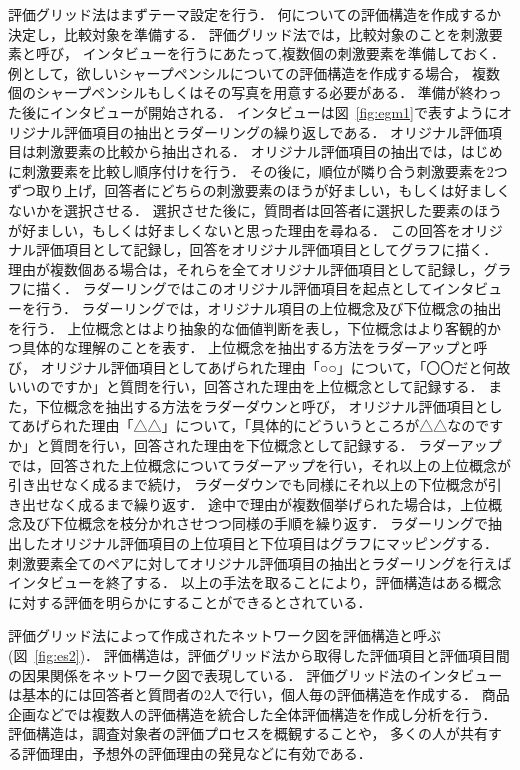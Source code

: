\documentclass[syuuron]{kuee}
\begin{document}
		評価グリッド法はまずテーマ設定を行う．
		何についての評価構造を作成するか決定し，比較対象を準備する．
		評価グリッド法では，比較対象のことを刺激要素と呼び，
		インタビューを行うにあたって,複数個の刺激要素を準備しておく．
		例として，欲しいシャープペンシルについての評価構造を作成する場合，
		複数個のシャープペンシルもしくはその写真を用意する必要がある．
		準備が終わった後にインタビューが開始される．
		インタビューは図~\ref{fig:egm1}で表すようにオリジナル評価項目の抽出とラダーリングの繰り返しである．
		オリジナル評価項目は刺激要素の比較から抽出される．
		オリジナル評価項目の抽出では，はじめに刺激要素を比較し順序付けを行う．
		その後に，順位が隣り合う刺激要素を2つずつ取り上げ，回答者にどちらの刺激要素のほうが好ましい，もしくは好ましくないかを選択させる．
		選択させた後に，質問者は回答者に選択した要素のほうが好ましい，もしくは好ましくないと思った理由を尋ねる．
		この回答をオリジナル評価項目として記録し，回答をオリジナル評価項目としてグラフに描く．
		理由が複数個ある場合は，それらを全てオリジナル評価項目として記録し，グラフに描く．
		ラダーリングではこのオリジナル評価項目を起点としてインタビューを行う．
		ラダーリングでは，オリジナル項目の上位概念及び下位概念の抽出を行う．
		上位概念とはより抽象的な価値判断を表し，下位概念はより客観的かつ具体的な理解のことを表す．
		上位概念を抽出する方法をラダーアップと呼び，
		オリジナル評価項目としてあげられた理由「○○」について，「〇〇だと何故いいのですか」と質問を行い，回答された理由を上位概念として記録する．
		また，下位概念を抽出する方法をラダーダウンと呼び，
		オリジナル評価項目としてあげられた理由「△△」について，「具体的にどういうところが△△なのですか」と質問を行い，回答された理由を下位概念として記録する．
		ラダーアップでは，回答された上位概念についてラダーアップを行い，それ以上の上位概念が引き出せなく成るまで続け，
		ラダーダウンでも同様にそれ以上の下位概念が引き出せなく成るまで繰り返す．
		途中で理由が複数個挙げられた場合は，上位概念及び下位概念を枝分かれさせつつ同様の手順を繰り返す．
		ラダーリングで抽出したオリジナル評価項目の上位項目と下位項目はグラフにマッピングする．
		刺激要素全てのペアに対してオリジナル評価項目の抽出とラダーリングを行えばインタビューを終了する．
		以上の手法を取ることにより，評価構造はある概念に対する評価を明らかにすることができるとされている．
		
		評価グリッド法によって作成されたネットワーク図を評価構造と呼ぶ(図~\ref{fig:es2})．
		評価構造は，評価グリッド法から取得した評価項目と評価項目間の因果関係をネットワーク図で表現している．
		評価グリッド法のインタビューは基本的には回答者と質問者の2人で行い，個人毎の評価構造を作成する．
		商品企画などでは複数人の評価構造を統合した全体評価構造を作成し分析を行う．
		評価構造は，調査対象者の評価プロセスを概観することや，
		多くの人が共有する評価理由，予想外の評価理由の発見などに有効である．
		
\end{document}
